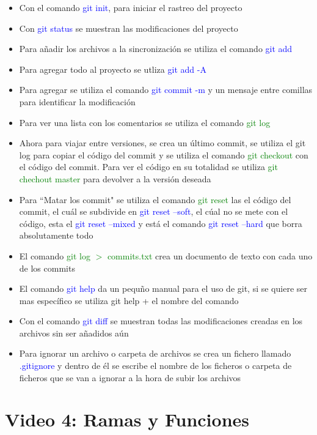 \documentclass{article}
\begin{document}
	\begin{itemize}
		\item Con el comando \textcolor{blue}{git init}, para iniciar el rastreo del proyecto
		\item Con \textcolor{blue}{git status} se muestran las modificaciones del proyecto
		\item Para añadir los archivos a la sincronización se utiliza el comando \textcolor{blue}{git add}
		\item Para agregar todo al proyecto se utliza \textcolor{blue}{git add -A}
		\item Para agregar se utiliza el comando \textcolor{blue}{git commit -m} y un mensaje entre comillas para identificar la modificación
		\item Para ver una lista con los comentarios se utiliza el comando \textcolor{green}{git log}
		\item Ahora para viajar entre versiones, se crea un último commit, se utiliza el git log para copiar el código del commit y se utiliza el comando \textcolor{green}{git checkout} con el código del commit. Para ver el código en su totalidad se utiliza \textcolor{green}{git chechout master} para devolver a la versión deseada
		\item Para ``Matar los commit" se utiliza el comando \textcolor{green}{git reset} las el código del commit, el cuál se subdivide en \textcolor{blue}{git reset --soft}, el cúal no se mete con el código, esta el \textcolor{blue}{git reset --mixed} y está el comando \textcolor{blue}{git reset --hard} que borra absolutamente todo
		\item El comando \textcolor{green}{git log $>$ commits.txt} crea un documento de texto con cada uno de los commits
		\item El comando \textcolor{blue}{git help} da un pequño manual para el uso de git, si se quiere ser mas específico se utiliza git help + el nombre del comando
		\item Con el comando \textcolor{blue}{git diff} se muestran todas las modificaciones creadas en los archivos sin ser añadidos aún
		\item Para ignorar un archivo o carpeta de archivos se crea un fichero llamado \textcolor{blue}{.gitignore} y dentro de él se escribe el nombre de los ficheros o carpeta de ficheros que se van a ignorar a la hora de subir los archivos
	\end{itemize}


	\section{Video 4: Ramas y Funciones}
	
\end{document}

